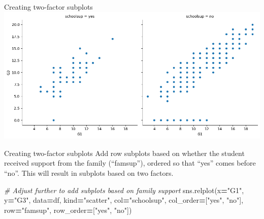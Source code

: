 \documentclass[
  ignorenonframetext,
]{beamer}
\newenvironment{Shaded}{\begin{snugshade}}{\end{snugshade}}
\newcommand{\CommentTok}[1]{\textcolor[rgb]{0.56,0.35,0.01}{\textit{#1}}}
\newcommand{\NormalTok}[1]{#1}
\newcommand{\OperatorTok}[1]{\textcolor[rgb]{0.81,0.36,0.00}{\textbf{#1}}}
\newcommand{\StringTok}[1]{\textcolor[rgb]{0.31,0.60,0.02}{#1}}
\begin{document}
\begin{frame}{Creating two-factor subplots}
\label{creating-two-factor-subplots-6}
\includegraphics{../images/im266.png}
\end{frame}

\begin{frame}[fragile]{Creating two-factor subplots}
\label{creating-two-factor-subplots-7}
Add row subplots based on whether the student received support from the
family (``famsup''), ordered so that ``yes'' comes before ``no''. This
will result in subplots based on two factors.


\begin{Shaded}
\begin{Highlighting}[]
\CommentTok{\# Adjust further to add subplots based on family support}
\NormalTok{sns.relplot(x}\OperatorTok{=}\StringTok{"G1"}\NormalTok{, y}\OperatorTok{=}\StringTok{"G3"}\NormalTok{, }
\NormalTok{            data}\OperatorTok{=}\NormalTok{df,}
\NormalTok{            kind}\OperatorTok{=}\StringTok{"scatter"}\NormalTok{, }
\NormalTok{            col}\OperatorTok{=}\StringTok{"schoolsup"}\NormalTok{,}
\NormalTok{            col\_order}\OperatorTok{=}\NormalTok{[}\StringTok{"yes"}\NormalTok{, }\StringTok{"no"}\NormalTok{],}
\NormalTok{            row}\OperatorTok{=}\StringTok{"famsup"}\NormalTok{,}
\NormalTok{            row\_order}\OperatorTok{=}\NormalTok{[}\StringTok{"yes"}\NormalTok{, }\StringTok{"no"}\NormalTok{])}
\end{Highlighting}
\end{Shaded}
\end{frame}
\end{document}
